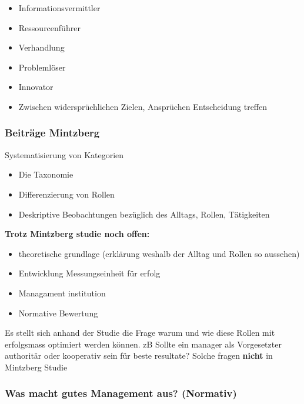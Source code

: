 \begin{itemize}
\begin{itemize}
        \item Informationsvermittler 

        \item Ressourcenführer

        \item Verhandlung

        \item Problemlöser 

        \item Innovator

        \item Zwischen widersprüchlichen Zielen, Ansprüchen Entscheidung treffen

    \end{itemize}
     
\end{itemize}


\subsubsection{Beiträge Mintzberg}

\begin{definition}
    [Taxonomie] Systematisierung von Kategorien
\end{definition}

\begin{itemize}
\item Die Taxonomie
\item Differenzierung von Rollen
\item Deskriptive Beobachtungen bezüglich des Alltags, Rollen, Tätigkeiten
\end{itemize}

\textbf{Trotz Mintzberg studie noch offen:}
\begin{itemize}
    \item theoretische grundlage (erklärung weshalb der Alltag und Rollen so aussehen)
    \item Entwicklung Messungseinheit für erfolg
    \item Managament institution
    \item Normative Bewertung
\end{itemize}

Es stellt sich anhand der Studie die Frage warum und wie diese Rollen mit erfolgsmass optimiert werden können.
zB Sollte ein manager als Vorgesetzter authoritär oder kooperativ sein für beste resultate? Solche fragen \textbf{nicht} in Mintzberg Studie
\pagebreak
\subsubsection{Was macht gutes Management aus? (Normativ)}


